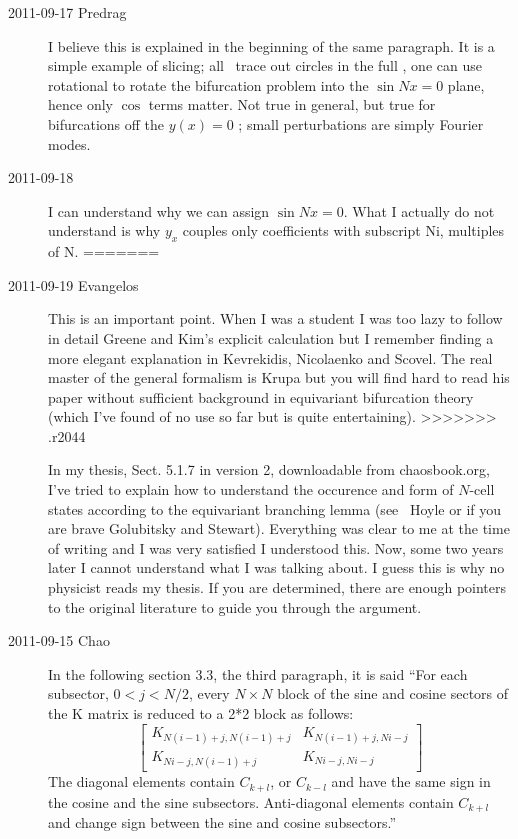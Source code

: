 \begin{description}
\item[2011-09-17 Predrag] I believe this is explained in the beginning of
the same paragraph. It is a simple example of slicing; all \reqva\ trace
out circles in the full \statesp, one can use rotational  to
rotate the bifurcation problem into the $\sin Nx = 0$ plane, hence only $\cos$
terms matter. Not true in general, but true for bifurcations off the $y(x)=0$
\eqv; small perturbations are simply Fourier modes.


\item[2011-09-18] I can understand why we can assign $\sin Nx = 0$. What I actually
do not understand is why $y_x$ couples only coefficients with subscript Ni, multiples
of  N.
=======
\item[2011-09-19 Evangelos] This is an important point. When I was a student
I was too lazy to follow in detail Greene and Kim's explicit calculation but
I remember finding a more elegant explanation in Kevrekidis, Nicolaenko 
and Scovel. The real master of the general formalism is 
Krupa but you will find hard to read his paper without sufficient
background in equivariant bifurcation theory (which I've found of no use so 
far but is quite entertaining).
>>>>>>> .r2044

In my thesis, Sect. 5.1.7 in version 2, downloadable from chaosbook.org, 
I've tried to explain how to understand the occurence and form of $N$-cell 
states according to the equivariant branching lemma 
(see \eg\ Hoyle or if you are brave Golubitsky and Stewart). 
Everything was clear to me at the time of
writing and I was very satisfied I understood this. Now, some two years later I cannot
understand what I was talking about. I guess this is why no physicist 
reads my thesis. If you are determined, there are enough pointers to the
original literature to guide you through the argument.

\item[2011-09-15 Chao]
In the following section 3.3, the third paragraph, it is said ``For each
subsector, $0<j<N/2$, every $N \times N$ block of the sine and cosine sectors of the
K matrix is reduced to a 2*2 block as follows:
\[
\left[
\begin{array}{cc}
K_{N(i-1)+j,N(i-1)+j}   &  K_{N(i-1)+j,Ni-j}\\
K_{Ni-j,N(i-1)+j}   &   K_{Ni-j,Ni-j}
\end{array}
\right]
\]
The diagonal elements contain $C_{k+l}$, or $C_{k-l}$ and have the same
sign in the cosine and the sine subsectors. Anti-diagonal elements
contain $C_{k+l}$ and change sign between the sine and cosine
subsectors.''


\end{description}
